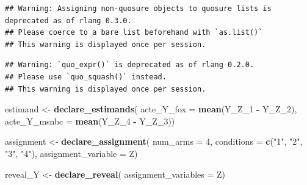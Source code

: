 \documentclass[]{article}
\newenvironment{Shaded}{\begin{snugshade}}{\end{snugshade}}
\newcommand{\DataTypeTok}[1]{\textcolor[rgb]{0.13,0.29,0.53}{#1}}
\newcommand{\DecValTok}[1]{\textcolor[rgb]{0.00,0.00,0.81}{#1}}
\newcommand{\KeywordTok}[1]{\textcolor[rgb]{0.13,0.29,0.53}{\textbf{#1}}}
\newcommand{\NormalTok}[1]{#1}
\newcommand{\OperatorTok}[1]{\textcolor[rgb]{0.81,0.36,0.00}{\textbf{#1}}}
\newcommand{\StringTok}[1]{\textcolor[rgb]{0.31,0.60,0.02}{#1}}
\begin{document}
\begin{verbatim}
## Warning: Assigning non-quosure objects to quosure lists is deprecated as of rlang 0.3.0.
## Please coerce to a bare list beforehand with `as.list()`
## This warning is displayed once per session.
\end{verbatim}

\begin{verbatim}
## Warning: `quo_expr()` is deprecated as of rlang 0.2.0.
## Please use `quo_squash()` instead.
## This warning is displayed once per session.
\end{verbatim}

\begin{Shaded}
\begin{Highlighting}[]
\NormalTok{estimand <{-}}\StringTok{ }\KeywordTok{declare\_estimands}\NormalTok{(}
  \DataTypeTok{acte\_Y\_fox =} \KeywordTok{mean}\NormalTok{(Y\_Z\_}\DecValTok{1} \OperatorTok{{-}}\StringTok{ }\NormalTok{Y\_Z\_}\DecValTok{2}\NormalTok{),}
  \DataTypeTok{acte\_Y\_msnbc =} \KeywordTok{mean}\NormalTok{(Y\_Z\_}\DecValTok{4} \OperatorTok{{-}}\StringTok{ }\NormalTok{Y\_Z\_}\DecValTok{3}\NormalTok{))}

\NormalTok{assignment <{-}}\StringTok{ }\KeywordTok{declare\_assignment}\NormalTok{(}
  \DataTypeTok{num\_arms =} \DecValTok{4}\NormalTok{,}
  \DataTypeTok{conditions =} \KeywordTok{c}\NormalTok{(}\StringTok{"1"}\NormalTok{, }\StringTok{"2"}\NormalTok{, }\StringTok{"3"}\NormalTok{, }\StringTok{"4"}\NormalTok{),}
  \DataTypeTok{assignment\_variable =}\NormalTok{ Z)}

\NormalTok{reveal\_Y <{-}}\StringTok{ }\KeywordTok{declare\_reveal}\NormalTok{(}
  \DataTypeTok{assignment\_variables =}\NormalTok{ Z)}


\end{Highlighting}
\end{Shaded}
\end{document}
